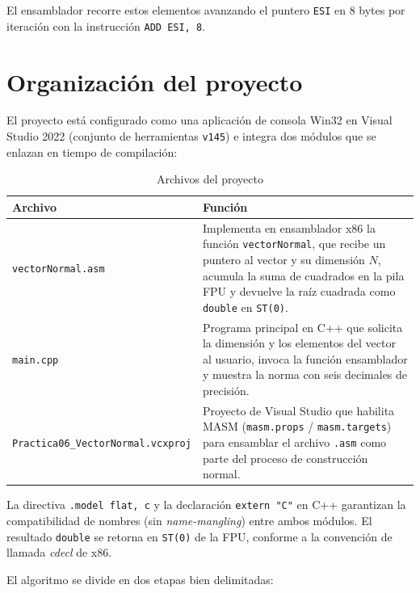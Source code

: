 \documentclass[12pt, letterpaper]{article}
\begin{document}
El ensamblador recorre estos elementos avanzando el puntero \texttt{ESI} en 8 bytes por iteración con la instrucción \texttt{ADD ESI, 8}.

\section{Organización del proyecto}

El proyecto está configurado como una aplicación de consola Win32 en Visual Studio 2022 (conjunto de herramientas \texttt{v145}) e integra dos módulos que se enlazan en tiempo de compilación:

\begin{table}[H]
    \centering
    \begin{tabular}{@{}lp{9cm}@{}}
        \toprule
        \textbf{Archivo} & \textbf{Función} \\
        \midrule
        \texttt{vectorNormal.asm} & Implementa en ensamblador x86 la función \texttt{vectorNormal}, que recibe un puntero al vector y su dimensión $N$, acumula la suma de cuadrados en la pila FPU y devuelve la raíz cuadrada como \texttt{double} en \texttt{ST(0)}. \\
        \texttt{main.cpp}          & Programa principal en C++ que solicita la dimensión y los elementos del vector al usuario, invoca la función ensamblador y muestra la norma con seis decimales de precisión. \\
        \texttt{Practica06\_VectorNormal.vcxproj} & Proyecto de Visual Studio que habilita MASM (\texttt{masm.props} / \texttt{masm.targets}) para ensamblar el archivo \texttt{.asm} como parte del proceso de construcción normal. \\
        \bottomrule
    \end{tabular}
    \caption{Archivos del proyecto}
\end{table}

La directiva \texttt{.model flat, c} y la declaración \texttt{extern "C"} en C++ garantizan la compatibilidad de nombres (sin \textit{name-mangling}) entre ambos módulos. El resultado \texttt{double} se retorna en \texttt{ST(0)} de la FPU, conforme a la convención de llamada \textit{cdecl} de x86.

El algoritmo se divide en dos etapas bien delimitadas:
\end{document}
